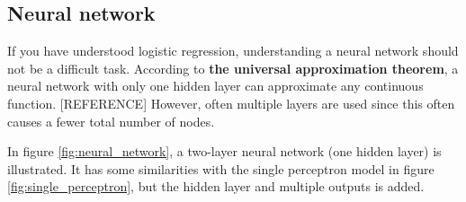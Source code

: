 \subsection{Neural network}
If you have understood logistic regression, understanding a neural network should not be a difficult task. According to  \textbf{the universal approximation theorem}, a neural network with only one hidden layer can approximate any continuous function. [REFERENCE] However, often multiple layers are used since this often causes a fewer total number of nodes. 

In figure \eqref{fig:neural_network}, a two-layer neural network (one hidden layer) is illustrated. It has some similarities with the single perceptron model in figure \eqref{fig:single_perceptron}, but the hidden layer and multiple outputs is added. 

